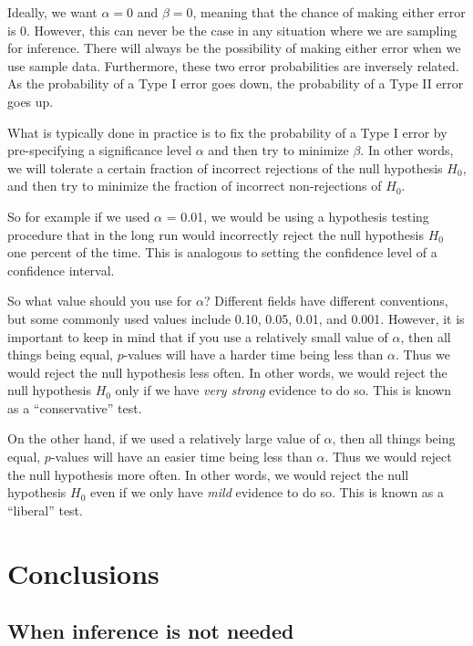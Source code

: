 \documentclass[
]{book}
\begin{document}
Ideally, we want \(\alpha = 0\) and \(\beta = 0\), meaning that the chance of making either error is 0. However, this can never be the case in any situation where we are sampling for inference. There will always be the possibility of making either error when we use sample data. Furthermore, these two error probabilities are inversely related. As the probability of a Type I error goes down, the probability of a Type II error goes up.

What is typically done in practice is to fix the probability of a Type I error by pre-specifying a significance level \(\alpha\) and then try to minimize \(\beta\). In other words, we will tolerate a certain fraction of incorrect rejections of the null hypothesis \(H_0\), and then try to minimize the fraction of incorrect non-rejections of \(H_0\).

So for example if we used \(\alpha\) = 0.01, we would be using a hypothesis testing procedure that in the long run would incorrectly reject the null hypothesis \(H_0\) one percent of the time. This is analogous to setting the confidence level of a confidence interval.

So what value should you use for \(\alpha\)?  Different fields have different conventions, but some commonly used values include 0.10, 0.05, 0.01, and 0.001. However, it is important to keep in mind that if you use a relatively small value of \(\alpha\), then all things being equal, \(p\)-values will have a harder time being less than \(\alpha\). Thus we would reject the null hypothesis less often. In other words, we would reject the null hypothesis \(H_0\) only if we have \emph{very strong} evidence to do so. This is known as a ``conservative'' test.

On the other hand, if we used a relatively large value of \(\alpha\), then all things being equal, \(p\)-values will have an easier time being less than \(\alpha\). Thus we would reject the null hypothesis more often. In other words, we would reject the null hypothesis \(H_0\) even if we only have \emph{mild} evidence to do so. This is known as a ``liberal'' test.

\hypertarget{conclusions}{%
\section{Conclusions}\label{conclusions}}

\hypertarget{when-inference-is-not-needed}{%
\subsection{When inference is not needed}\label{when-inference-is-not-needed}}
\end{document}
